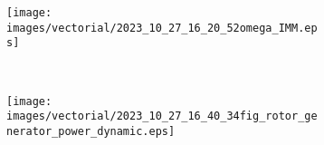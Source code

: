 \documentclass[11pt, a4paper]{article}
\begin{document}
\begin{figure}[htb]
  \centering
  \begin{subfigure}{0.49\textwidth}
    \centering
    \texttt{[image: images/vectorial/2023\_10\_27\_16\_20\_52omega\_IMM.eps]}
  \end{subfigure}
  \\
  \begin{subfigure}{0.65\textwidth}
    \centering
    \texttt{[image: images/vectorial/2023\_10\_27\_16\_40\_34fig\_rotor\_generator\_power\_dynamic.eps]}
  \end{subfigure}
\end{figure}
\end{document}
